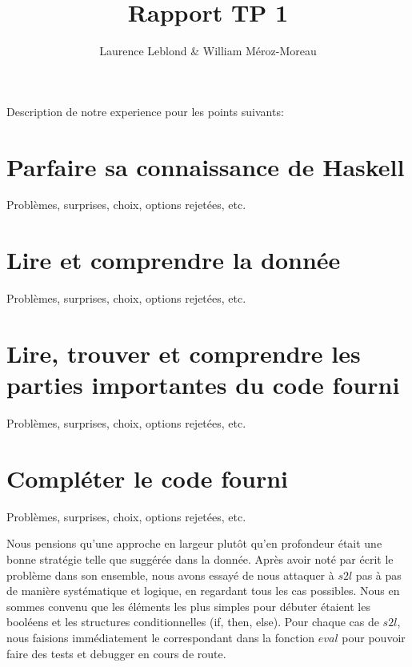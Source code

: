 \documentclass{article}
\title{Rapport TP 1}
\author {Laurence Leblond & William Méroz-Moreau}
\begin{document}
Description de notre experience pour les points suivants:

\section{Parfaire sa connaissance de Haskell}

Problèmes, surprises, choix, options rejetées, etc.

\section{Lire et comprendre la donnée}

Problèmes, surprises, choix, options rejetées, etc.

\section{Lire, trouver et comprendre les parties importantes du code fourni}

Problèmes, surprises, choix, options rejetées, etc.


\section{Compléter le code fourni}
Problèmes, surprises, choix, options rejetées, etc.

Nous pensions qu'une approche en largeur plutôt qu'en profondeur était une bonne stratégie telle que suggérée dans la donnée. Après avoir noté par écrit le problème dans son ensemble, nous avons essayé de nous attaquer à $s2l$ pas à pas de manière systématique et logique, en regardant tous les cas possibles. Nous en sommes convenu que les éléments les plus simples pour débuter étaient les booléens et les structures conditionnelles (if, then, else). Pour chaque cas de $s2l$, nous faisions immédiatement le correspondant dans la fonction $eval$ pour pouvoir faire des tests et debugger en cours de route.
\end{document}
